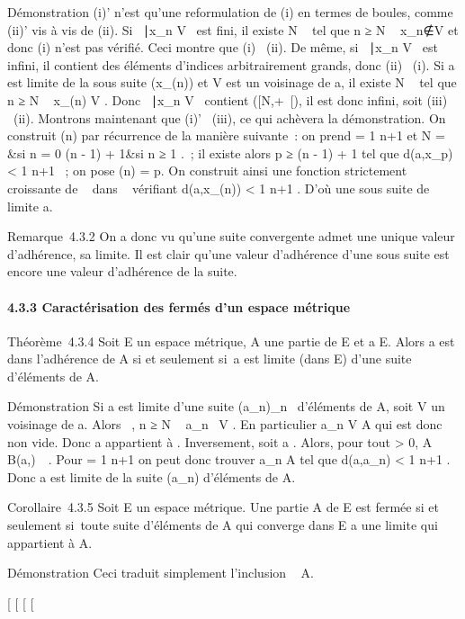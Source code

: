 \documentclass[]{article}
\begin{document}
Démonstration (i)' n'est qu'une reformulation de (i) en termes de
boules, comme (ii)' vis à vis de (ii). Si \n \in
{}~∣x_n \in V \ est
fini, il existe N \in {}~ tel que n ≥ N \rigtharrow~
x_n∉V et donc (i) n'est pas vérifié.
Ceci montre que (i) \rigtharrow~(ii). De même, si \n \in
{}~∣x_n \in V \ est
infini, il contient des éléments d'indices arbitrairement grands, donc
(ii) \rigtharrow~(i). Si a est limite de la sous suite (x_\phi(n)) et V est
un voisinage de a, il existe N \in {}~ tel que n ≥ N \rigtharrow~ x_\phi(n) \in V .
Donc \n \in {}~∣x_n \in V
\ contient \phi([N,+\infty~[), il est donc infini, soit
(iii) \rigtharrow~(ii). Montrons maintenant que (i)' \rigtharrow~(iii), ce qui achèvera la
démonstration. On construit \phi(n) par récurrence de la manière suivante~:
on prend \epsilon = 1 \over n+1 et N = \left
\  &si n = 0
\cr \phi(n - 1) + 1&si n ≥ 1 \cr 
\right .~; il existe alors p ≥ \phi(n - 1) + 1 tel que
d(a,x_p) < 1 \over n+1 ~; on pose
\phi(n) = p. On construit ainsi une fonction strictement croissante de ~
dans ~ vérifiant d(a,x_\phi(n)) < 1
\over n+1 . D'où une sous suite de limite a.

Remarque~4.3.2 On a donc vu qu'une suite convergente admet une unique
valeur d'adhérence, sa limite. Il est clair qu'une valeur d'adhérence
d'une sous suite est encore une valeur d'adhérence de la suite.

\paragraph{4.3.3 Caractérisation des fermés d'un espace métrique}

Théorème~4.3.4 Soit E un espace métrique, A une partie de E et a \in E.
Alors a est dans l'adhérence de A si et seulement si~a est limite (dans
E) d'une suite d'éléments de A.

Démonstration Si a est limite d'une suite (a_n)_n\in{}~
d'éléments de A, soit V un voisinage de a. Alors
\existsN \in {}~, n ≥ N \rigtharrow~ a_n~ \in V . En
particulier a_n \in V \bigcap A qui est donc non vide. Donc a
appartient à \overlineA. Inversement, soit a
\in\overlineA. Alors, pour tout \epsilon > 0, A \bigcap
B(a,\epsilon)\neq~\varnothing~. Pour \epsilon = 1 \over
n+1 on peut donc trouver a_n \in A tel que d(a,a_n)
< 1 \over n+1 . Donc a est limite de la
suite (a_n) d'éléments de A.

Corollaire~4.3.5 Soit E un espace métrique. Une partie A de E est fermée
si et seulement si~toute suite d'éléments de A qui converge dans E a une
limite qui appartient à A.

Démonstration Ceci traduit simplement l'inclusion
\overlineA \subset~ A.

[
[
[
[
\end{document}
